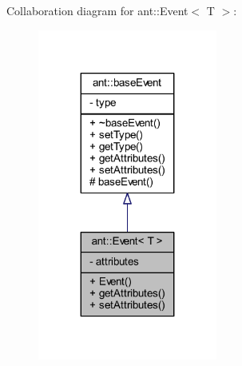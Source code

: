 Collaboration diagram for ant\+:\+:Event$<$ T $>$\+:
\nopagebreak
\begin{figure}[H]
\begin{center}
\leavevmode
\includegraphics[width=167pt]{d7/d45/classant_1_1_event__coll__graph}
\end{center}
\end{figure}
